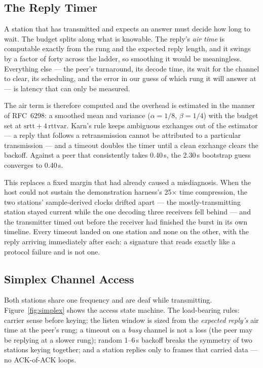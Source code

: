 \subsection{The Reply Timer}
\label{sec:rto}

A station that has transmitted and expects an answer must decide how
long to wait.  The budget splits along what is knowable.  The reply's
\emph{air time} is computable exactly from the rung and the expected
reply length, and it swings by a factor of forty across the ladder, so
smoothing it would be meaningless.  Everything else --- the peer's
turnaround, its decode time, its wait for the channel to clear, its
scheduling, and the error in our guess of which rung it will answer at
--- is latency that can only be measured.

The air term is therefore computed and the overhead is estimated in
the manner of RFC~6298: a smoothed mean and variance
($\alpha = 1/8$, $\beta = 1/4$) with the budget set at
$\text{srtt} + 4\,\text{rttvar}$.  Karn's rule keeps ambiguous
exchanges out of the estimator --- a reply that follows a
retransmission cannot be attributed to a particular transmission ---
and a timeout doubles the timer until a clean exchange clears the
backoff.  Against a peer that consistently takes 0.40\,s, the
2.30\,s bootstrap guess converges to 0.40\,s.

This replaces a fixed margin that had already caused a
misdiagnosis. When the host could not sustain the demonstration
harness's 25$\times$ time compression, the two stations' sample-derived
clocks drifted apart --- the mostly-transmitting station stayed
current while the one decoding three receivers fell behind --- and the
transmitter timed out before the receiver had finished the burst in
its own timeline.  Every timeout landed on one station and none on the
other, with the reply arriving immediately after each: a signature
that reads exactly like a protocol failure and is not one.

\subsection{Simplex Channel Access}

Both stations share one frequency and are deaf while transmitting.
Figure~\ref{fig:simplex} shows the access state machine.  The
load-bearing rules: carrier sense before keying; the listen window is
sized from the \emph{expected reply's} air time at the peer's rung; a
timeout on a \emph{busy} channel is not a loss (the peer may be
replying at a slower rung); random 1--6\,s backoff breaks the symmetry
of two stations keying together; and a station replies only to frames
that carried data --- no ACK-of-ACK loops.

